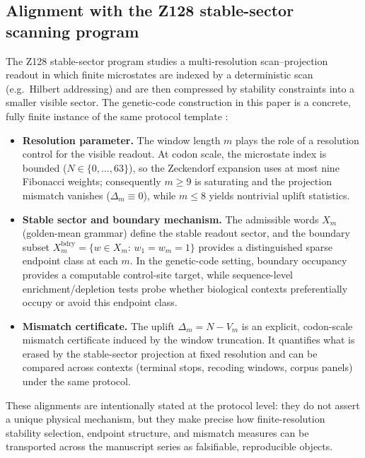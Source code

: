 \subsection{Alignment with the Z128 stable-sector scanning program}
\label{app:z128_alignment}

The Z128 stable-sector program \cite{Ma2025Z128SM} studies a multi-resolution scan--projection readout in which finite microstates are indexed by a deterministic scan (e.g.\ Hilbert addressing) and are then compressed by stability constraints into a smaller visible sector.
The genetic-code construction in this paper is a concrete, fully finite instance of the same protocol template \cite{Ma2025RF}:
\begin{itemize}
  \item \textbf{Resolution parameter.} The window length $m$ plays the role of a resolution control for the visible readout.
  At codon scale, the microstate index is bounded ($N\in\{0,\dots,63\}$), so the Zeckendorf expansion uses at most nine Fibonacci weights; consequently $m\ge 9$ is saturating and the projection mismatch vanishes ($\Delta_m\equiv 0$), while $m\le 8$ yields nontrivial uplift statistics.
  \item \textbf{Stable sector and boundary mechanism.} The admissible words $X_m$ (golden-mean grammar) define the stable readout sector, and the boundary subset $X_m^{\mathrm{bdry}}=\{w\in X_m:\,w_1=w_m=1\}$ provides a distinguished sparse endpoint class at each $m$.
  In the genetic-code setting, boundary occupancy provides a computable control-site target, while sequence-level enrichment/depletion tests probe whether biological contexts preferentially occupy or avoid this endpoint class.
  \item \textbf{Mismatch certificate.} The uplift $\Delta_m=N-V_m$ is an explicit, codon-scale mismatch certificate induced by the window truncation.
  It quantifies what is erased by the stable-sector projection at fixed resolution and can be compared across contexts (terminal stops, recoding windows, corpus panels) under the same protocol.
\end{itemize}

These alignments are intentionally stated at the protocol level: they do not assert a unique physical mechanism, but they make precise how finite-resolution stability selection, endpoint structure, and mismatch measures can be transported across the manuscript series as falsifiable, reproducible objects.


